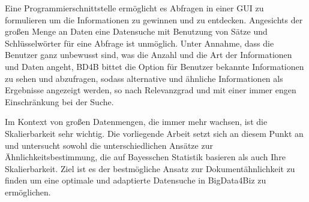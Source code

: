 Eine Programmierschnittstelle ermöglicht es Abfragen in einer GUI zu formulieren um die Informationen zu gewinnen und zu entdecken. Angesichts der großen Menge an Daten eine Datensuche mit Benutzung von Sätze und Schlüsselwörter für eine Abfrage ist unmöglich. Unter Annahme, dass die Benutzer ganz unbewusst sind, was die Anzahl und die Art der Informationen und Daten angeht, BD4B bittet die Option für Benutzer bekannte Informationen zu sehen und abzufragen, sodass alternative und ähnliche Informationen als Ergebnisse angezeigt werden, so nach Relevanzgrad und mit einer immer engen Einschränkung bei der Suche.  

Im Kontext von großen Datenmengen, die immer mehr wachsen, ist die Skalierbarkeit sehr wichtig. Die vorliegende Arbeit setzt sich an diesem Punkt an und untersucht sowohl die unterschiedlichen Ansätze zur Ähnlichkeitsbestimmung, die auf Bayesschen Statistik basieren als auch Ihre Skalierbarkeit. Ziel ist es der bestmögliche Ansatz zur Dokumentähnlichkeit zu finden um eine optimale und adaptierte Datensuche in BigData4Biz zu ermöglichen. 




